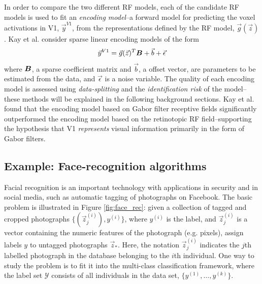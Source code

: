 In order to compare the two different RF models, each of the candidate
RF models is used to fit an \emph{encoding model}--a forward model for
predicting the voxel activations in V1, $\vec{y}^{V1}$, from the
representations defined by the RF model, $\vec{g}(\vec{z})$.  Kay et
al. consider sparse linear encoding models of the form
\[
\vec{y}^{V1} = \vec{g}(\vec{z})^T \boldsymbol{B} + \vec{b} + \vec{\epsilon}
\]
where $\boldsymbol{B}$, a sparse coefficient matrix and $\vec{b}$, a offset
vector, are parameters to be estimated from the data, and
$\vec{\epsilon}$ is a noise variable.  The quality of each encoding
model is assessed using \emph{data-splitting} and the
\emph{identification risk} of the model--these methods will be
explained in the following background sections.  Kay et al. found that
the encoding model based on Gabor filter receptive fields
significantly outperformed the encoding model based on the retinotopic
RF field--supporting the hypothesis that V1 \emph{represents} visual
information primarily in the form of Gabor filters.

\subsection{Example: Face-recognition algorithms}

Facial recognition is an important technology with applications in
security and in social media, such as automatic tagging of photographs
on Facebook.  The basic problem is illustrated in Figure
\ref{fig:face_rec}: given a collection of tagged and cropped
photographs $\{(\vec{z}_j^{(i)}), y^{(i)}\}$, where $y^{(i)}$ is the
label, and $\vec{z}_j^{(i)}$ is a vector containing the numeric
features of the photograph (e.g. pixels), assign labels $y$ to
untagged photographs $\vec{z}_*$.  Here, the notation
$\vec{z}_j^{(i)}$ indicates the $j$th labelled photograph in the
database belonging to the $i$th individual. One way to study the
problem is to fit it into the multi-class classification framework,
where the label set $\mathcal{Y}$ consists of all individuals in the
data set, $\{y^{(1)},\hdots, y^{(k)}\}$.

